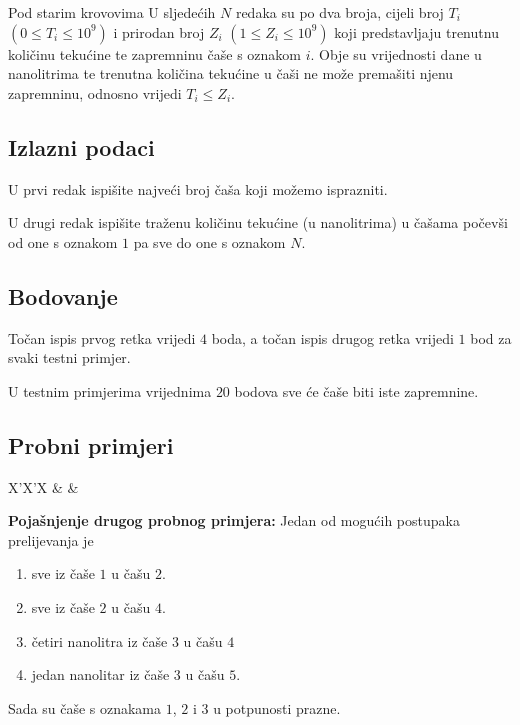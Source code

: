 \begin{statement}[
  problempoints=50,
  timelimit=1 sekunda,
  memorylimit=512 MiB,
]{Pod starim krovovima}
U sljedećih $N$ redaka su po dva broja, cijeli broj $T_i$ $(0 \le T_i \le 10^9)$
i prirodan broj $Z_i$ $(1 \le Z_i \le 10^9)$ koji predstavljaju trenutnu
količinu tekućine te zapremninu čaše s oznakom $i$. Obje su vrijednosti dane
u nanolitrima te trenutna količina tekućine u čaši ne može premašiti njenu
zapremninu, odnosno vrijedi $T_i \le Z_i$.

\subsection*{Izlazni podaci}
U prvi redak ispišite najveći broj čaša koji možemo isprazniti.

U drugi redak ispišite traženu količinu tekućine (u nanolitrima) u čašama
počevši od one s oznakom $1$ pa sve do one s oznakom $N$.

\subsection*{Bodovanje}
Točan ispis prvog retka vrijedi $4$ boda, a točan ispis drugog retka vrijedi $1$
bod za svaki testni primjer.

U testnim primjerima vrijednima $20$ bodova sve će čaše biti iste
zapremnine.

\subsection*{Probni primjeri}
\begin{tabularx}{\textwidth}{X'X'X}
 &
 &
\end{tabularx}

\textbf{Pojašnjenje drugog probnog primjera:}
Jedan od mogućih postupaka prelijevanja je
\begin{enumerate}
  \item sve iz čaše $1$ u čašu $2$.
  \item sve iz čaše $2$ u čašu $4$.
  \item četiri nanolitra iz čaše $3$ u čašu $4$
  \item jedan nanolitar iz čaše $3$ u čašu $5$.
\end{enumerate}
Sada su čaše s oznakama $1$, $2$ i $3$ u potpunosti prazne.

\end{statement}

